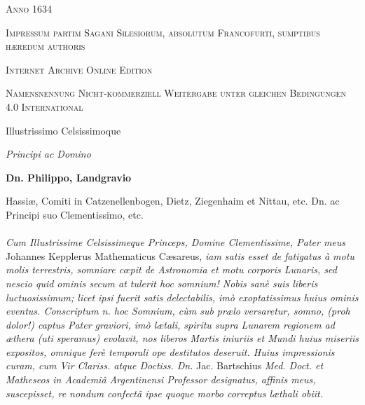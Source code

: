 \documentclass[a4paper, 11pt, oneside, polutonikogreek, german]{article}
\begin{document}
\begin{titlepage}
        \vspace*{\fill}

	\vspace{1\baselineskip}

	{\small\scshape Anno 1634}
	
	{\small\scshape{Impressum partim Sagani Silesiorum, absolutum Francofurti, sumptibus hæredum authoris}}
	
	\vspace{0.5\baselineskip} %

        \scshape Internet Archive Online Edition%
    
	{\scshape\small Namensnennung Nicht-kommerziell Weitergabe unter gleichen Bedingungen 4.0 International} %
\end{titlepage}
\setlength{\parskip}{1mm plus1mm minus1mm}
\clearpage
\begin{center}
Illustrissimo Celsissimoque

\emph{Principi ac Domino}

\textbf{Dn. Philippo, Landgravio}

{\small Hassiæ, Comiti in Catzenellenbogen, Dietz, Ziegenhaim et Nittau, etc. Dn. ac Principi suo Clementissimo, etc.}
\end{center}
\paragraph{}
\emph{Cum Illustrissime Celsissimeque Princeps, Domine Clementissime, Pater meus} Johannes Kepplerus Mathematicus Cæsareus, \emph{iam satis esset de fatigatus à motu molis terrestris, somniare cœpit de Astronomia et motu corporis Lunaris, sed nescio quid ominis secum at tulerit hoc somnium! Nobis sanè suis liberis luctuosissimum; licet ipsi fuerit satis delectabilis, imò exoptatissimus huius ominis eventus. Conscriptum n. hoc Somnium, cùm sub prælo versaretur, somno, (proh dolor!) captus Pater graviori, imò lætali, spiritu supra Lunarem regionem ad æthera (uti speramus) evolavit, nos liberos Martis iniuriis et Mundi huius miseriis expositos, omnique ferè temporali ope destitutos deseruit. Huius impressionis curam, cum Vir Clariss. atque Doctiss. Dn.} Jac. Bartschius \emph{Med. Doct. et Matheseos in Academiâ Argentinensi Professor designatus, affinis meus, suscepisset, re nondum confectâ ipse quoque morbo correptus læthali obiit.}
\end{document}
